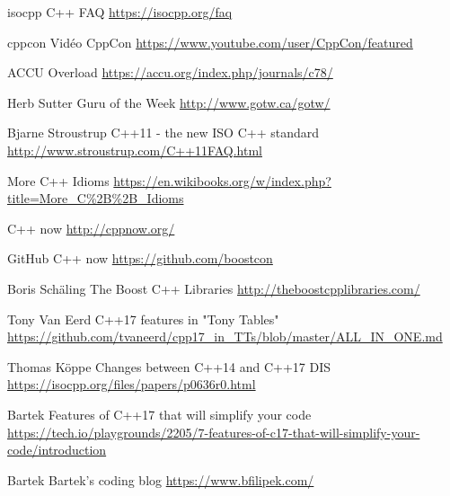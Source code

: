 \documentclass[C++.tex]{subfiles}
\begin{document}
\begin{frame}[allowframebreaks]
\begin{thebibliography}{1}
		isocpp
		\newblock C++ FAQ
		\newblock \url{https://isocpp.org/faq}

		cppcon
		\newblock Vidéo CppCon
		\newblock \url{https://www.youtube.com/user/CppCon/featured}

		ACCU
		\newblock Overload
		\newblock \url{https://accu.org/index.php/journals/c78/}

		Herb Sutter
		\newblock Guru of the Week
		\newblock \url{http://www.gotw.ca/gotw/}

		Bjarne Stroustrup
		\newblock C++11 - the new ISO C++ standard
		\newblock \url{http://www.stroustrup.com/C++11FAQ.html}
			
		\newblock More C++ Idioms
		\newblock \url{https://en.wikibooks.org/w/index.php?title=More\_C\%2B\%2B\_Idioms}

		\newblock C++ now
		\newblock \url{http://cppnow.org/}

		\newblock GitHub C++ now
		\newblock \url{https://github.com/boostcon}

		Boris Schäling
		\newblock The Boost C++ Libraries
		\newblock \url{http://theboostcpplibraries.com/}

		Tony Van Eerd
		\newblock C++17 features in "Tony Tables"
		\newblock \url{https://github.com/tvaneerd/cpp17_in_TTs/blob/master/ALL_IN_ONE.md}

		Thomas Köppe
		\newblock Changes between C++14 and C++17 DIS
		\newblock \url{https://isocpp.org/files/papers/p0636r0.html}

		Bartek
		 Features of C++17 that will simplify your code
		\newblock \url{https://tech.io/playgrounds/2205/7-features-of-c17-that-will-simplify-your-code/introduction}

		Bartek
		\newblock Bartek's coding blog
		\newblock \url{https://www.bfilipek.com/}
	\end{thebibliography}
\end{frame}
\end{document}
